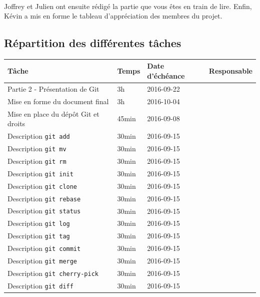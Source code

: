 \documentclass[11pt,canadien]{article}
\begin{document}
\paragraph{}Joffrey et Julien ont ensuite rédigé la partie que vous êtes en train de lire. Enfin, Kévin a mis en forme le tableau d'appréciation des membres du projet.

\newpage
\begin{appendices} %

\section{Répartition des différentes tâches}
\begin{tabular}{l l l l}
	\textbf{Tâche} & \textbf{Temps} & \textbf{Date d'échéance} & \textbf{Responsable}
	\\ \hline
	   Partie 2 - Présentation de Git       & 3h    & 2016-09-22 & \antoine
	\\ Mise en forme du document final      & 3h    & 2016-10-04 & \kevin
	\\ Mise en place du dépôt Git et droits & 45min & 2016-09-08 & \joffrey
	\\ Description \texttt{git add}         & 30min & 2016-09-15 & \estelle
	\\ Description \texttt{git mv}          & 30min & 2016-09-15 & \estelle
	\\ Description \texttt{git rm}          & 30min & 2016-09-15 & \estelle
	\\ Description \texttt{git init}        & 30min & 2016-09-15 & \julien
	\\ Description \texttt{git clone}       & 30min & 2016-09-15 & \julien
	\\ Description \texttt{git rebase}      & 30min & 2016-09-15 & \julien
	\\ Description \texttt{git status}      & 30min & 2016-09-15 & \valentin
	\\ Description \texttt{git log}         & 30min & 2016-09-15 & \valentin
	\\ Description \texttt{git tag}         & 30min & 2016-09-15 & \valentin
	\\ Description \texttt{git commit}      & 30min & 2016-09-15 & \joffrey
	\\ Description \texttt{git merge}       & 30min & 2016-09-15 & \joffrey
	\\ Description \texttt{git cherry-pick} & 30min & 2016-09-15 & \joffrey
	\\ Description \texttt{git diff}        & 30min & 2016-09-15 & \karen

\end{tabular}
\end{appendices}
\end{document}

